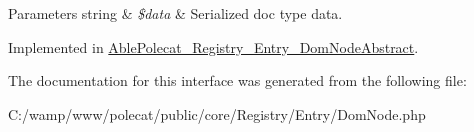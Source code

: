 \begin{DoxyParams}[1]{Parameters}
string & {\em \$data} & Serialized doc type data. \\
\hline
\end{DoxyParams}


Implemented in \hyperlink{class_able_polecat___registry___entry___dom_node_abstract_aafcf863b2a7a62d48806270ef03a8c2d}{Able\+Polecat\+\_\+\+Registry\+\_\+\+Entry\+\_\+\+Dom\+Node\+Abstract}.



The documentation for this interface was generated from the following file\+:\begin{DoxyCompactItemize}
\item 
C\+:/wamp/www/polecat/public/core/\+Registry/\+Entry/Dom\+Node.\+php\end{DoxyCompactItemize}
